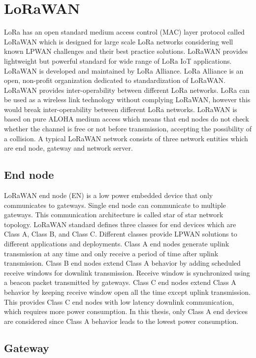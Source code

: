 \section{LoRaWAN}

LoRa has an open standard medium access control (MAC) layer protocol called LoRaWAN which is designed for large scale LoRa networks considering well known LPWAN challenges and their best practice solutions. LoRaWAN provides lightweight but powerful standard for wide range of LoRa IoT applications. LoRaWAN is developed and maintained by LoRa Alliance. LoRa Alliance is an open, non-profit organization dedicated to standardization of LoRaWAN. LoRaWAN provides inter-operability between different LoRa networks. LoRa can be used as a wireless link technology without complying LoRaWAN, however this would break inter-operability between different LoRa networks. LoRaWAN is based on pure ALOHA medium access which means that end nodes do not check whether the channel is free or not before transmission, accepting the possibility of a collision. A typical LoRaWAN network consists of three network entities which are end node, gateway and network server.

\subsection{End node}

LoRaWAN end node (EN) is a low power embedded device that only communicates to gateways. Single end node can communicate to multiple gateways. This communication architecture is called star of star network topology. LoRaWAN standard defines three classes for end devices which are Class A, Class B, and Class C. Different classes provide LPWAN solutions to different applications and deployments. Class A end nodes generate uplink transmission at any time and only receive a period of time after uplink transmission. Class B end nodes extend Class A behavior by adding scheduled receive windows for downlink transmission. Receive window is synchronized using a beacon packet transmitted by gateways. Class C end nodes extend Class A behavior by keeping receive window open all the time except uplink transmission. This provides Class C end nodes with low latency downlink communication, which requires more power consumption. In this thesis, only Class A end devices are considered since Class A behavior leads to the lowest power consumption.

\subsection{Gateway}

